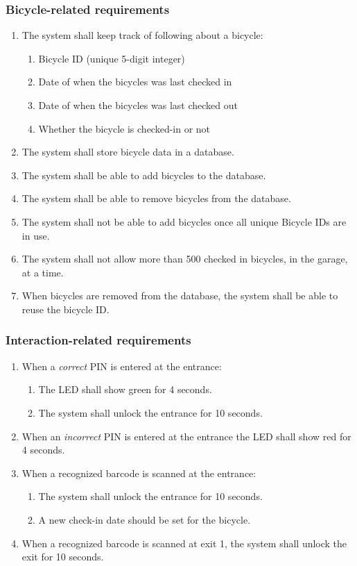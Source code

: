\documentclass[12pt,titlepage,bibliography=totoc]{article}
\begin{document}
\subsubsection{Bicycle-related requirements}
\begin{enumerate}
	\item The system shall keep track of following about a bicycle:
	\begin{enumerate}
		\item Bicycle ID (unique 5-digit integer)
		\item Date of when the bicycles was last checked in
		\item Date of when the bicycles was last checked out
		\item Whether the bicycle is checked-in or not
	\end{enumerate}
	\item The system shall store bicycle data in a database.
	\item The system shall be able to add bicycles to the database.
	\item The system shall be able to remove bicycles from the database.
	\item The system shall not be able to add bicycles once all unique Bicycle IDs are in use.
	\item The system shall not allow more than 500 checked in bicycles, in the garage, at a time.
	\item When bicycles are removed from the database, the system shall be able to reuse the bicycle ID.
\end{enumerate}
\subsubsection{Interaction-related requirements}
\begin{enumerate}
	\item When a \emph{correct} PIN is entered at the entrance:
		\begin{enumerate}
			\item The LED shall show green for 4 seconds.
			\item The system shall unlock the entrance for 10 seconds.
		\end{enumerate}
	\item When an \emph{incorrect} PIN is entered at the entrance the LED shall show red for 4 seconds.
	\item When a recognized barcode is scanned at the entrance:
		\begin{enumerate}
			\item The system shall unlock the entrance for 10 seconds.
			\item A new check-in date should be set for the bicycle.
		\end{enumerate}
	\item When a recognized barcode is scanned at exit 1, the system shall unlock the exit for 10 seconds.
\end{enumerate}
\end{document}
